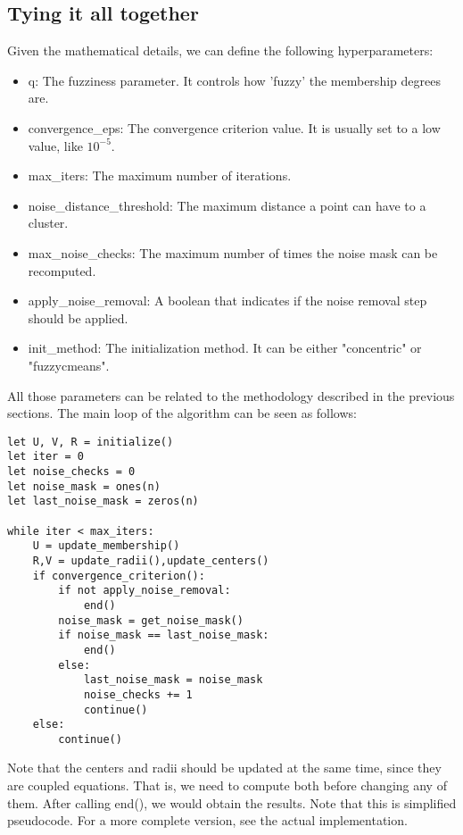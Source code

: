 \documentclass[conference]{IEEEtran}
\begin{document}
\subsection{Tying it all together}
Given the mathematical details, we can define the following hyperparameters:
\begin{itemize}
    \item q: The fuzziness parameter. It controls how 'fuzzy' the membership degrees are.
    \item convergence\_eps: The convergence criterion value. It is usually set to a low value, like $10^{-5}$.
    \item max\_iters: The maximum number of iterations.
    \item noise\_distance\_threshold: The maximum distance a point can have to a cluster.
    \item max\_noise\_checks: The maximum number of times the noise mask can be recomputed.
    \item apply\_noise\_removal: A boolean that indicates if the noise removal step should be applied.
    \item init\_method: The initialization method. It can be either "concentric" or "fuzzycmeans".
\end{itemize}
All those parameters can be related to the methodology described in the previous sections.
The main loop of the algorithm can be seen as follows:
\begin{verbatim}
let U, V, R = initialize()
let iter = 0
let noise_checks = 0
let noise_mask = ones(n)
let last_noise_mask = zeros(n)

while iter < max_iters:
    U = update_membership()
    R,V = update_radii(),update_centers()
    if convergence_criterion():
        if not apply_noise_removal:
            end()
        noise_mask = get_noise_mask()
        if noise_mask == last_noise_mask:
            end()
        else:
            last_noise_mask = noise_mask
            noise_checks += 1
            continue()
    else:
        continue()
\end{verbatim}
Note that the centers and radii should be updated at the same time, since they are coupled equations. That is, we need to compute both before changing any of them.
After calling end(), we would obtain the results. Note that this is simplified pseudocode. For a more complete version, see the actual implementation.
\end{document}
